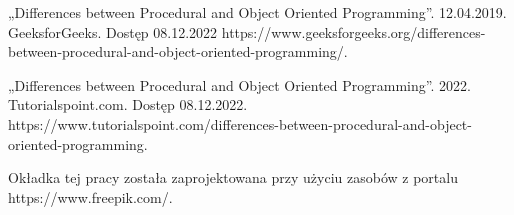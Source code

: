 \begin{thebibliography}{}

\begin{flushleft}
    „Differences between Procedural and Object Oriented Programming”. 12.04.2019. GeeksforGeeks. Dostęp 08.12.2022 https://www.geeksforgeeks.org/differences-between-procedural-and-object-oriented-programming/.
\end{flushleft}


\begin{flushleft}
    „Differences between Procedural and Object Oriented Programming”. 2022. Tutorialspoint.com. Dostęp 08.12.2022. https://www.tutorialspoint.com/differences-between-procedural-and-object-oriented-programming.
\end{flushleft}

\end{thebibliography}

\begin{flushleft}
    Okładka tej pracy została zaprojektowana przy użyciu zasobów z portalu https://www.freepik.com/.
\end{flushleft}
